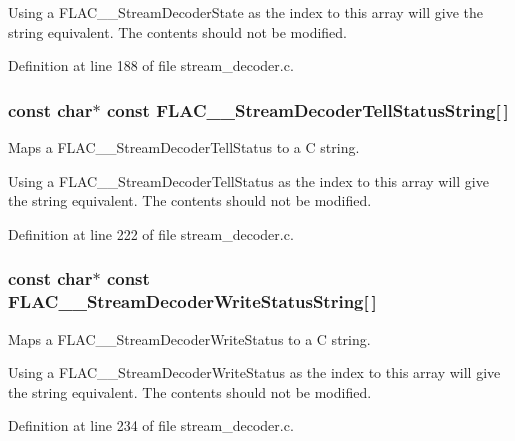 Using a F\+L\+A\+C\+\_\+\+\_\+\+Stream\+Decoder\+State as the index to this array will give the string equivalent. The contents should not be modified. 

Definition at line 188 of file stream\+\_\+decoder.\+c.

\subsubsection[{\texorpdfstring{F\+L\+A\+C\+\_\+\+\_\+\+Stream\+Decoder\+Tell\+Status\+String}{FLAC__StreamDecoderTellStatusString}}]{ {\bf const} char$\ast$ {\bf const} F\+L\+A\+C\+\_\+\+\_\+\+Stream\+Decoder\+Tell\+Status\+String\mbox{[}$\,$\mbox{]}}\hypertarget{group__flac__stream__decoder_ga907456321fb657036c7d5a48ef2adfa6}{}\label{group__flac__stream__decoder_ga907456321fb657036c7d5a48ef2adfa6}
Maps a F\+L\+A\+C\+\_\+\+\_\+\+Stream\+Decoder\+Tell\+Status to a C string.

Using a F\+L\+A\+C\+\_\+\+\_\+\+Stream\+Decoder\+Tell\+Status as the index to this array will give the string equivalent. The contents should not be modified. 

Definition at line 222 of file stream\+\_\+decoder.\+c.

\subsubsection[{\texorpdfstring{F\+L\+A\+C\+\_\+\+\_\+\+Stream\+Decoder\+Write\+Status\+String}{FLAC__StreamDecoderWriteStatusString}}]{ {\bf const} char$\ast$ {\bf const} F\+L\+A\+C\+\_\+\+\_\+\+Stream\+Decoder\+Write\+Status\+String\mbox{[}$\,$\mbox{]}}\hypertarget{group__flac__stream__decoder_gae0c0c4f29a8524aedc58778504923297}{}\label{group__flac__stream__decoder_gae0c0c4f29a8524aedc58778504923297}
Maps a F\+L\+A\+C\+\_\+\+\_\+\+Stream\+Decoder\+Write\+Status to a C string.

Using a F\+L\+A\+C\+\_\+\+\_\+\+Stream\+Decoder\+Write\+Status as the index to this array will give the string equivalent. The contents should not be modified. 

Definition at line 234 of file stream\+\_\+decoder.\+c.

